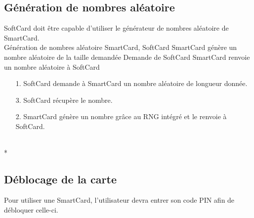 \documentclass[a4paper,11pt,french]{article}
\begin{document}
\subsection{Génération de nombres aléatoire}
SoftCard doit être capable d'utiliser le générateur de nombres aléatoire de
SmartCard.\\

\fiche
	{Génération de nombres aléatoire}
	{SmartCard, SoftCard}
    {SmartCard génère un nombre aléatoire de la taille demandée}
	{}
    {Demande de SoftCard}
    {SmartCard renvoie un nombre aléatoire à SoftCard}
	{\begin{itemize}
	    \item[]
	  \item[1.] SoftCard demande à SmartCard un nombre aléatoire de longueur 
          donnée.
      \item[3.] SoftCard récupère le nombre.
	\end{itemize}
	}
	{\begin{itemize}
        \item[]
        \item[2.] SmartCard génère un nombre grâce au RNG intégré et le renvoie
            à SoftCard.
	\end{itemize}
    }
	{}
\flots
    {}
    {}
    {}
\\*

\subsection{Déblocage de la carte}
Pour utiliser une SmartCard, l'utilisateur devra entrer son code PIN afin de 
\og{}débloquer \fg{} celle-ci.\\
\end{document}
